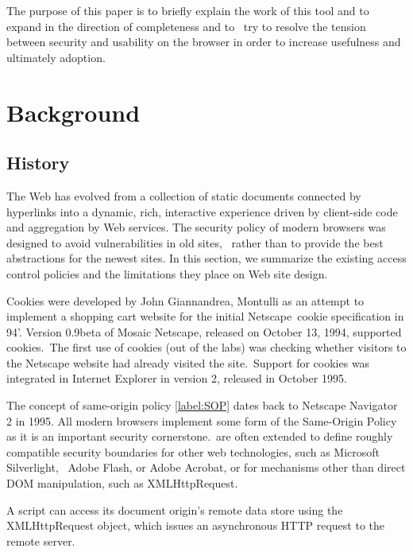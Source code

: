 \documentclass[a4paper,12pt]{paper}
\begin{document}
The purpose of this paper is to briefly explain the work of this tool and to expand in the direction of completeness and to \
try to resolve the tension between security and usability on the browser in order to increase usefulness and ultimately adoption.\

\section{Background}

\subsection{History}

The Web has evolved from a collection of static documents connected by hyperlinks into a dynamic, rich, interactive experience
driven by client-side code and aggregation by Web services. The security policy of modern browsers was designed to avoid vulnerabilities in old sites, \
rather than to provide the best abstractions for the newest sites. In this section, we summarize the existing access
control policies and the limitations they place on Web site design.

Cookies were developed by John Giannandrea, Montulli as an attempt to implement a shopping cart website for the initial Netscape\
cookie specification in 94'. Version 0.9beta of Mosaic Netscape, released on October 13, 1994, supported cookies.\
The first use of cookies (out of the labs) was checking whether visitors to the Netscape website had already visited the site.\
Support for cookies was integrated in Internet Explorer in version 2, released in October 1995.\

The concept of same-origin policy  \ref{label:SOP} dates back to Netscape Navigator 2 in 1995. All modern browsers implement some form of the Same-Origin Policy as it is an important security cornerstone.\
are often extended to define roughly compatible security boundaries for other web technologies, such as Microsoft Silverlight, \
Adobe Flash, or Adobe Acrobat, or for mechanisms other than direct DOM manipulation, such as XMLHttpRequest.\


A script can access its document origin’s remote data store using the XMLHttpRequest object, which issues an asynchronous HTTP request to the remote server.\
\end{document}

